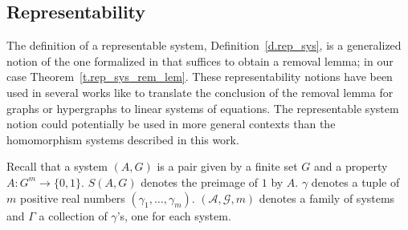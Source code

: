\documentclass[10pt]{article}
\begin{document}
\subsection{Representability} \label{s.rep_tech_def}

The definition of a representable system, Definition~\ref{d.rep_sys}, is a generalized notion of the one formalized in \cite{sha10} that suffices to obtain a removal lemma; in our case Theorem~\ref{t.rep_sys_rem_lem}. These representability notions have been used in several works like \cite{can_tesis_09,kraserven08,kraserven09,kraserven12,ksv13,sha10,sze10} 
to translate the conclusion of the removal lemma for graphs or hypergraphs to linear systems of equations.
 The representable system notion could potentially be used in more general contexts than the homomorphism systems described in this work.

Recall that a system $(A,G)$ is a pair given by a finite set $G$ and a property $A:G^m\to \{0,1\}$. $S(A,G)$ denotes the preimage of $1$ by $A$. $\gamma$ denotes a tuple of $m$ positive real numbers $(\gamma_1,\ldots,\gamma_m)$.
$(\mathcal{A},\mathcal{G},m)$ denotes a family of systems and $\Gamma$ a collection of $\gamma$'s, one for each system.
\end{document}
